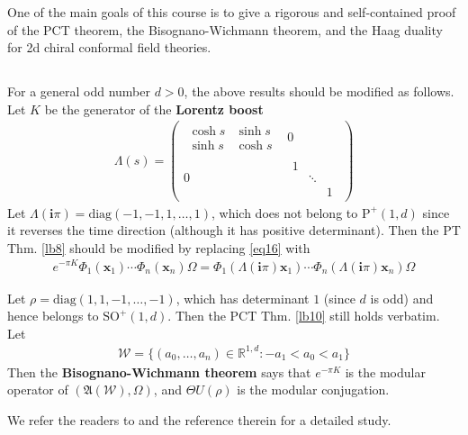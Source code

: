 \documentclass[12pt,b5paper,notitlepage]{article}
\theoremstyle{definition}
\theoremstyle{plain}
\newcommand{\fk}{\mathfrak}
\newcommand{\mc}{\mathcal}
\newcommand{\diag}{\mathrm{diag}}
\newcommand{\im}{\mathbf{i}}
\newcommand{\Rbb}{\mathbb R}
\newcommand{\Poid}{{\mathrm P}^+(1,d)}
\newcommand{\xbf}{\mathbf x}
\newcommand{\SO}{\mathrm{SO}}
\numberwithin{equation}{section}
\begin{document}
One of the main goals of this course is to give a rigorous and self-contained proof of the PCT theorem, the Bisognano-Wichmann theorem, and the Haag duality for 2d chiral conformal field theories.




\subsection{}

For a general odd number $d>0$, the above results should be modified as follows. Let $K$ be the generator of the \textbf{Lorentz boost} 
\begin{align*}
\Lambda(s)=\left(
\begin{array}{c|c}
\begin{matrix}
\cosh s&\sinh s\\
\sinh s&\cosh s
\end{matrix}
&0\\
\hline
0&
\begin{matrix}
1&&\\
&\ddots&\\
&&1
\end{matrix}
\end{array}
\right)
\end{align*}
Let $\Lambda(\im\pi)=\diag(-1,-1,1,\dots,1)$, which does not belong to $\Poid$ since it reverses the time direction (although it has positive determinant). Then the PT Thm. \ref{lb8} should be modified by replacing \eqref{eq16} with 
\begin{align}
e^{-\pi K}\Phi_1(\xbf_1)\cdots\Phi_n(\xbf_n)\Omega=\Phi_1(\Lambda(\im\pi)\xbf_1)\cdots\Phi_n(\Lambda(\im\pi)\xbf_n)\Omega
\end{align} 

Let $\rho=\diag(1,1,-1,\dots,-1)$, which has determinant $1$ (since $d$ is odd) and hence belongs to $\SO^+(1,d)$. Then the PCT Thm. \ref{lb10} still holds verbatim. Let
\begin{align}
\mc W=\{(a_0,\dots,a_n)\in\Rbb^{1,d}:-a_1<a_0<a_1\}
\end{align}
Then the \textbf{Bisognano-Wichmann theorem} says that $e^{-\pi K}$ is the modular operator of $(\fk A(\mc W),\Omega)$, and $\Theta U(\rho)$ is the modular conjugation. 


We refer the readers to \cite[Sec. V.4.1]{Haag} and the reference therein for a detailed study.
 


\newpage
\end{document}
